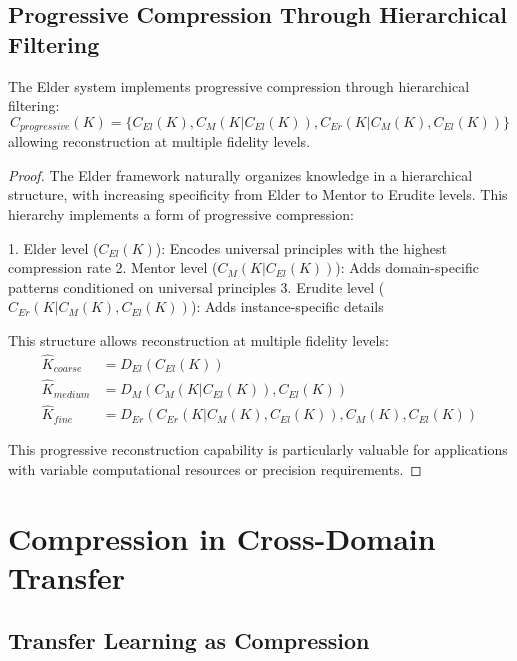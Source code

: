 \subsection{Progressive Compression Through Hierarchical Filtering}

\begin{theorem}
The Elder system implements progressive compression through hierarchical filtering:
\begin{equation}
C_{progressive}(K) = \{C_{El}(K), C_{M}(K | C_{El}(K)), C_{Er}(K | C_{M}(K), C_{El}(K))\}
\end{equation}
allowing reconstruction at multiple fidelity levels.
\end{theorem}

\begin{proof}
The Elder framework naturally organizes knowledge in a hierarchical structure, with increasing specificity from Elder to Mentor to Erudite levels. This hierarchy implements a form of progressive compression:

1. Elder level ($C_{El}(K)$): Encodes universal principles with the highest compression rate
2. Mentor level ($C_{M}(K | C_{El}(K))$): Adds domain-specific patterns conditioned on universal principles
3. Erudite level ($C_{Er}(K | C_{M}(K), C_{El}(K))$): Adds instance-specific details

This structure allows reconstruction at multiple fidelity levels:
\begin{align}
\hat{K}_{coarse} &= D_{El}(C_{El}(K)) \\
\hat{K}_{medium} &= D_{M}(C_{M}(K | C_{El}(K)), C_{El}(K)) \\
\hat{K}_{fine} &= D_{Er}(C_{Er}(K | C_{M}(K), C_{El}(K)), C_{M}(K), C_{El}(K))
\end{align}

This progressive reconstruction capability is particularly valuable for applications with variable computational resources or precision requirements.
\end{proof}

\section{Compression in Cross-Domain Transfer}

\subsection{Transfer Learning as Compression}


